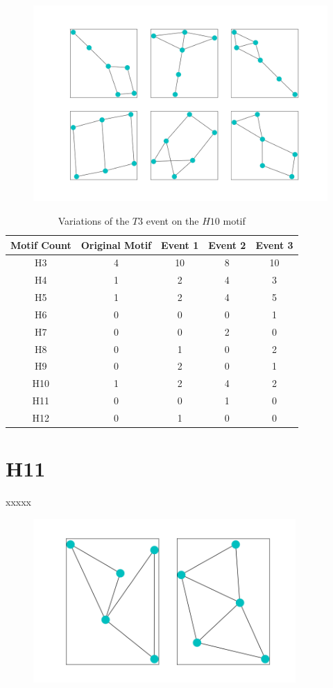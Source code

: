 \begin{figure}
    \includegraphics[width=15cm]{Images/H10_T3_evolution.png}
\end{figure}
\begin{table}
    \centering
    \begin{tabular}{||c c c c c||} 
    \hline
    Motif Count & Original Motif & Event 1 & Event 2 & Event 3 \\ [0.5ex] 
    \hline\hline
    H3 & 4 & 10 & 8 & 10 \\ 
    \hline
    H4 & 1 & 2 & 4 & 3 \\
    \hline
    H5 & 1 & 2 & 4 & 5\\
    \hline
    H6 & 0 & 0 & 0 & 1 \\
    \hline
    H7 & 0 & 0 & 2 & 0 \\
    \hline
    H8 & 0 & 1 & 0 & 2\\
    \hline
    H9 & 0 & 2 & 0 & 1\\
    \hline
    H10 & 1 & 2 & 4 & 2\\
    \hline
    H11 & 0 & 0 & 1 & 0\\
    \hline
    H12 & 0 & 1 & 0 & 0\\
    \hline
   \end{tabular}
   \caption{Variations of the $T3$ event on the $H10$ motif}
   \label{table:19}
\end{table}

\section{H11}
xxxxx

\begin{figure}
    \includegraphics[width=10cm]{Images/H11_T3_evolution.png}
    \centering
\end{figure}

